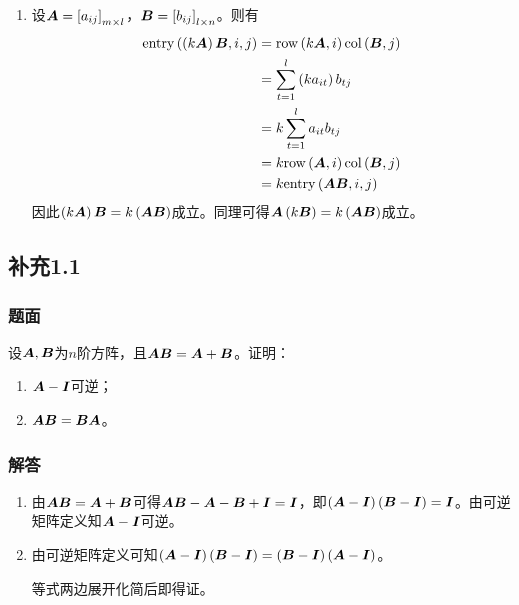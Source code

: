 \documentclass{beamer}
\begin{document}
\begin{frame}[allowframebreaks]
\begin{enumerate}
        \item
              {
              设\(\boldsymbol{A}=\left[ a_{ij} \right]_{m\times l}\)，\(\boldsymbol{B}=\left[ b_{ij} \right]_{l\times n}\)。则有
              \begin{align*}
                  \mathrm{entry}\left( \left( k\boldsymbol{A} \right)\boldsymbol{B},i,j \right) & =\mathrm{row}\left( k\boldsymbol{A},i \right)\mathrm{col}\left( \boldsymbol{B},j \right)     \\
                                                    & =\sum_{t=1}^l\left( ka_{it} \right)b_{tj} \\
                                                    & =k\sum_{t=1}^la_{it}b_{tj}         \\
                                                    & =k\mathrm{row}\left( \boldsymbol{A},i \right)\mathrm{col}\left( \boldsymbol{B},j \right)     \\
                                                    & =k\mathrm{entry}\left( \boldsymbol{A}\boldsymbol{B},i,j \right)
              \end{align*}
              因此\(\left( k\boldsymbol{A} \right)\boldsymbol{B}=k\left( \boldsymbol{A}\boldsymbol{B} \right)\)成立。同理可得\(\boldsymbol{A}\left( k\boldsymbol{B} \right)=k\left( \boldsymbol{A}\boldsymbol{B} \right)\)成立。
              }
    \end{enumerate}

\end{frame}

\subsection*{补充1.1}

\begin{frame}
\frametitle{题面}

    设\(\boldsymbol{A},\boldsymbol{B}\)为\(n\)阶方阵，且\(\boldsymbol{A}\boldsymbol{B}=\boldsymbol{A}+\boldsymbol{B}\)。证明：
    \begin{enumerate}
        \item \(\boldsymbol{A}-\boldsymbol{I}\)可逆；
        \item \(\boldsymbol{A}\boldsymbol{B}=\boldsymbol{B}\boldsymbol{A}\)。
    \end{enumerate}

\end{frame}

\begin{frame}
\frametitle{解答}

    \begin{enumerate}
        \item
              {
              由\(\boldsymbol{A}\boldsymbol{B}=\boldsymbol{A}+\boldsymbol{B}\)可得\(\boldsymbol{A}\boldsymbol{B}-\boldsymbol{A}-\boldsymbol{B}+\boldsymbol{I}=\boldsymbol{I}\)，即\(\left( \boldsymbol{A}-\boldsymbol{I} \right)\left( \boldsymbol{B}-\boldsymbol{I} \right)=\boldsymbol{I}\)。由可逆矩阵定义知\(\boldsymbol{A}-\boldsymbol{I}\)可逆。
              }
              \pause
        \item
              {
              由可逆矩阵定义可知\(\left( \boldsymbol{A}-\boldsymbol{I} \right)\left( \boldsymbol{B}-\boldsymbol{I} \right)=\left( \boldsymbol{B}-\boldsymbol{I} \right)\left( \boldsymbol{A}-\boldsymbol{I} \right)\)。

              等式两边展开化简后即得证。
              }
    \end{enumerate}

\end{frame}
\end{document}
